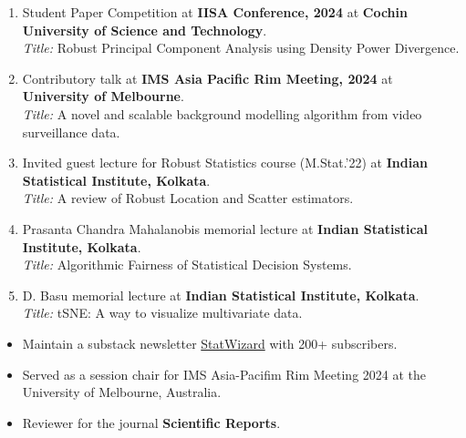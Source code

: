 \documentclass[10pt]{developercv} %
\begin{document}
\begin{enumerate}
    \item Student Paper Competition at \textbf{IISA Conference, 2024} at \textbf{Cochin University of Science and Technology}. \\
    \emph{Title:} Robust Principal Component Analysis using Density Power Divergence.
    \item Contributory talk at \textbf{IMS Asia Pacific Rim Meeting, 2024} at \textbf{University of Melbourne}. \\
    \emph{Title:} A novel and scalable background modelling algorithm from video surveillance data.
    \item Invited guest lecture for Robust Statistics course (M.Stat.'22) at \textbf{Indian Statistical Institute, Kolkata}.\\
    \emph{Title:} A review of Robust Location and Scatter estimators.
    \item Prasanta Chandra Mahalanobis memorial lecture at \textbf{Indian Statistical Institute, Kolkata}.\\
    \emph{Title:} Algorithmic Fairness of Statistical Decision Systems.
    \item D. Basu memorial lecture at \textbf{Indian Statistical Institute, Kolkata}.\\
    \emph{Title:} tSNE: A way to visualize multivariate data.
\end{enumerate}


\vspace{-6pt}
\begin{itemize}[noitemsep]
    \item Maintain a substack newsletter \href{https://statwizard.substack.com/?showWelcome=true}{StatWizard} with 200+ subscribers.
    \item Served as a session chair for IMS Asia-Pacifim Rim Meeting 2024 at the University of Melbourne, Australia.
    \item Reviewer for the journal \textbf{Scientific Reports}.
\end{itemize}
\end{document}
